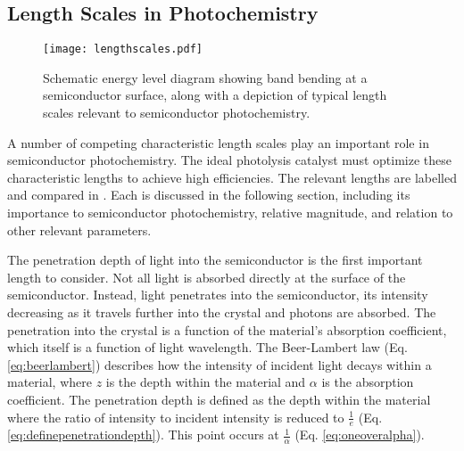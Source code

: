 \subsection{Length Scales in Photochemistry}
\label{subsec:background.lengthscales} %

\begin{figure}
\begin{center}
\texttt{[image: lengthscales.pdf]}
\caption[Band bending at semiconductor surface]{%
	Schematic energy level diagram showing band bending at a semiconductor 
	surface, along with a depiction of typical length scales relevant to 
	semiconductor photochemistry.}
\label{fig:lengthscales}
\end{center}
\end{figure}

A number of competing characteristic length scales play an important role in semiconductor photochemistry. The ideal photolysis catalyst must optimize these characteristic lengths to achieve high efficiencies. The relevant lengths are labelled and compared in . Each is discussed in the following section, including its importance to semiconductor photochemistry, relative magnitude, and relation to other relevant parameters.

The penetration depth of light into the semiconductor is the first important length to consider. Not all light is absorbed directly at the surface of the semiconductor. Instead, light penetrates into the semiconductor, its intensity decreasing as it travels further into the crystal and photons are absorbed. The penetration into the crystal is a function of the material's absorption coefficient, which itself is a function of light wavelength. The Beer-Lambert law (Eq. \ref{eq:beerlambert}) describes how the intensity of incident light decays within a material, where $z$ is the depth within the material and $\alpha$ is the absorption coefficient. The penetration depth is defined as the depth within the material where the ratio of intensity to incident intensity is reduced to  $\frac{1}{e}$ (Eq. \ref{eq:definepenetrationdepth}). This point occurs at $\frac{1}{\alpha}$ (Eq. \ref{eq:oneoveralpha}).

